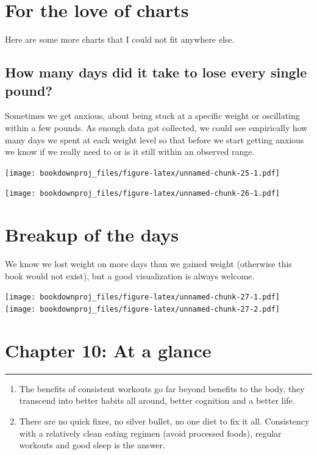 \documentclass[
  oneside]{book}
\begin{document}
\hypertarget{for-the-love-of-charts}{%
\section{For the love of charts}\label{for-the-love-of-charts}}

Here are some more charts that I could not fit anywhere else.

\hypertarget{how-many-days-did-it-take-to-lose-every-single-pound}{%
\subsection{How many days did it take to lose every single pound?}\label{how-many-days-did-it-take-to-lose-every-single-pound}}

Sometimes we get anxious, about being stuck at a specific weight or oscillating within a few pounds. As enough data got collected, we could see empirically how many days we spent at each weight level so that before we start getting anxious we know if we really need to or is it still within an observed range.

\texttt{[image: bookdownproj\_files/figure-latex/unnamed-chunk-25-1.pdf]}

\texttt{[image: bookdownproj\_files/figure-latex/unnamed-chunk-26-1.pdf]}

\hypertarget{breakup-of-the-days}{%
\section{Breakup of the days}\label{breakup-of-the-days}}

We know we lost weight on more days than we gained weight (otherwise this book would not exist), but a good visualization is always welcome.

\texttt{[image: bookdownproj\_files/figure-latex/unnamed-chunk-27-1.pdf]} \texttt{[image: bookdownproj\_files/figure-latex/unnamed-chunk-27-2.pdf]}

\hypertarget{chapter-10-at-a-glance}{%
\section{Chapter 10: At a glance}\label{chapter-10-at-a-glance}}

\begin{center}\rule{0.5\linewidth}{0.5pt}\end{center}

\begin{enumerate}
\def\labelenumi{\arabic{enumi}.}
\item
  The benefits of consistent workouts go far beyond benefits to the body, they transcend into better habits all around, better cognition and a better life.
\item
  There are no quick fixes, no silver bullet, no one diet to fix it all. Consistency with a relatively clean eating regimen (avoid processed foods), regular workouts and good sleep is the answer.
\end{enumerate}
\end{document}
